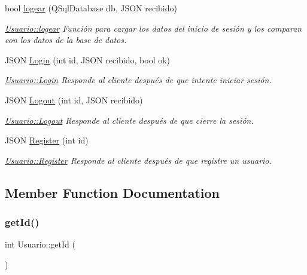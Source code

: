 \begin{DoxyCompactItemize}
bool \mbox{\hyperlink{classUsuario_a95a63c1e8c167f7084198257dbb0ad60}{logear}} (Q\+Sql\+Database db, J\+S\+ON recibido)
\begin{DoxyCompactList}\small\item\em \mbox{\hyperlink{classUsuario_a95a63c1e8c167f7084198257dbb0ad60}{Usuario\+::logear}} Función para cargar los datos del inicio de sesión y los comparan con los datos de la base de datos. \end{DoxyCompactList}\item 
J\+S\+ON \mbox{\hyperlink{classUsuario_a872132bd9723c5d50fcb13cafb9e32f3}{Login}} (int id, J\+S\+ON recibido, bool ok)
\begin{DoxyCompactList}\small\item\em \mbox{\hyperlink{classUsuario_a872132bd9723c5d50fcb13cafb9e32f3}{Usuario\+::\+Login}} Responde al cliente después de que intente iniciar sesión. \end{DoxyCompactList}\item 
J\+S\+ON \mbox{\hyperlink{classUsuario_a367203925ceb4d4c5bba0dd9cde3df5e}{Logout}} (int id, J\+S\+ON recibido)
\begin{DoxyCompactList}\small\item\em \mbox{\hyperlink{classUsuario_a367203925ceb4d4c5bba0dd9cde3df5e}{Usuario\+::\+Logout}} Responde al cliente después de que cierre la sesión. \end{DoxyCompactList}\item 
J\+S\+ON \mbox{\hyperlink{classUsuario_a5e04b1906fba3578e33b44a7e4e32aae}{Register}} (int id)
\begin{DoxyCompactList}\small\item\em \mbox{\hyperlink{classUsuario_a5e04b1906fba3578e33b44a7e4e32aae}{Usuario\+::\+Register}} Responde al cliente después de que registre un usuario. \end{DoxyCompactList}\end{DoxyCompactItemize}


\subsection{Member Function Documentation}
\mbox{\label{classUsuario_af72cadb2cfa815ef3318f2544d1df4ef}} 
\subsubsection{\texorpdfstring{get\+Id()}{getId()}}
{\footnotesize\ttfamily int Usuario\+::get\+Id (\begin{DoxyParamCaption}{ }\end{DoxyParamCaption})}



